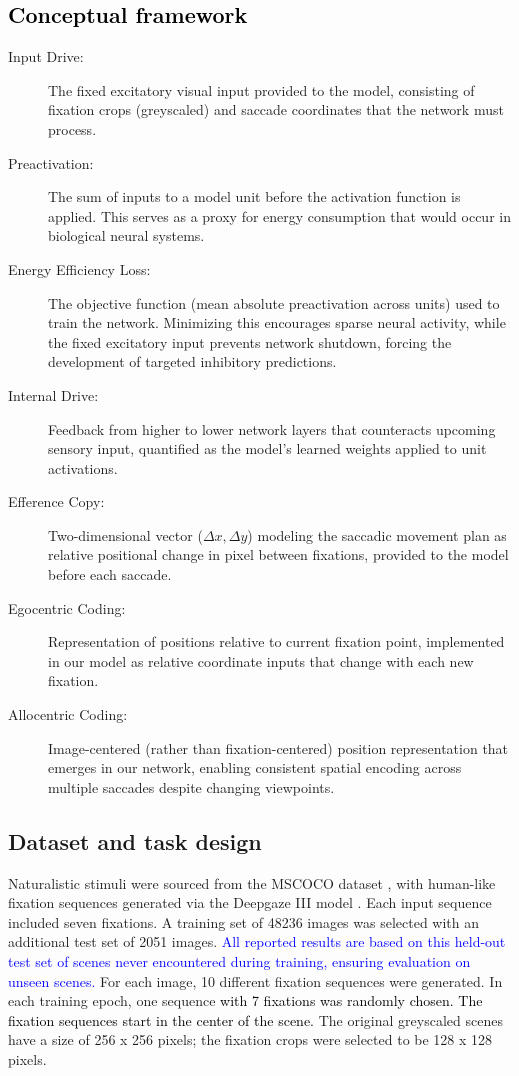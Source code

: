\documentclass[10pt,letterpaper]{article}
\begin{document}
\subsection*{\textcolor{black}{Conceptual framework}}
\begin{description}
\item[Input Drive:] The fixed excitatory visual input provided to the model, consisting of fixation crops (greyscaled) and saccade coordinates that the network must process.
\item[Preactivation:] The sum of inputs to a model unit before the activation function is applied. This serves as a proxy for energy consumption that would occur in biological neural systems.
\item[Energy Efficiency Loss:] The objective function (mean absolute preactivation across units) used to train the network. Minimizing this encourages sparse neural activity, while the fixed excitatory input prevents network shutdown, forcing the development of targeted inhibitory predictions.
\item[Internal Drive:]  Feedback from higher to lower network layers that counteracts upcoming sensory input, quantified as the model's learned weights applied to unit activations.
\item[Efference Copy:] Two-dimensional vector ($\Delta x, \Delta y$) modeling the saccadic movement plan as relative positional change in pixel between fixations, provided to the model before each saccade.
\item[Egocentric Coding:] Representation of positions relative to current fixation point, implemented in our model as relative coordinate inputs that change with each new fixation.
\item[Allocentric Coding:] Image-centered (rather than fixation-centered) position representation that emerges in our network, enabling consistent spatial encoding across multiple saccades despite changing viewpoints.
\end{description}

\subsection{Dataset and task design}
Naturalistic stimuli were sourced from the MSCOCO dataset \citep{lin_microsoft_2015}, with human-like fixation sequences generated via the Deepgaze III model \citep{kummerer_deepgaze_2022}. Each input sequence included seven fixations. A training set of 48236 images was selected with an additional test set of 2051 images. \textcolor{blue}{All reported results are based on this held-out test set of scenes never encountered during training, ensuring evaluation on unseen scenes.} For each image, 10 different fixation sequences were generated. In each training epoch, one sequence \textcolor{black}{with 7 fixations was randomly chosen. The fixation sequences start in the center of the scene.} The original greyscaled scenes have a size of 256 x 256 pixels; the fixation crops were selected to be 128 x 128 pixels.
\end{document}
